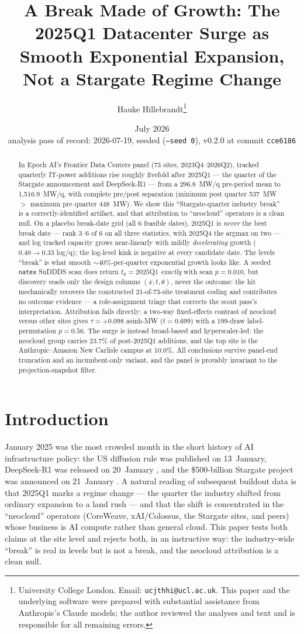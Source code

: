 \documentclass[11pt]{article}
\title{A Break Made of Growth: The 2025Q1 Datacenter Surge as Smooth
Exponential Expansion, Not a Stargate Regime Change}
\author{Hauke Hillebrandt\thanks{University College London. Email:
\texttt{ucjthhi@ucl.ac.uk}. This paper and the underlying \natex{} software were
prepared with substantial assistance from Anthropic's Claude models; the author
reviewed the analyses and text and is responsible for all remaining errors.}}
\date{July 2026 \\ \small analysis pass of record: 2026-07-19, seeded
(\texttt{--seed 0}), \natex{} v0.2.0 at commit \texttt{cce6186}}
\newcommand{\natex}{\texttt{natex}}
\begin{document}
\maketitle

\begin{abstract}
\noindent In Epoch AI's Frontier Data Centers panel (73 sites, 2023Q4--2026Q2),
tracked quarterly IT-power additions rise roughly fivefold after 2025Q1 --- the
quarter of the Stargate announcement and DeepSeek-R1 --- from a 296.8~MW/q
pre-period mean to 1{,}516.9~MW/q, with complete pre/post separation (minimum
post quarter 537~MW $>$ maximum pre quarter 448~MW). We show this
``Stargate-quarter industry break'' is a correctly-identified artifact, and
that attribution to ``neocloud'' operators is a clean null. On a placebo
break-date grid (all 6 feasible dates), 2025Q1 is \emph{never} the best break
date --- rank 3--6 of 6 on all three statistics, with 2025Q4 the argmax on two
--- and log tracked capacity grows near-linearly with mildly
\emph{decelerating} growth ($0.40 \to 0.33$ log/q); the log-level kink is
negative at every candidate date. The levels ``break'' is what smooth
$\sim$40\%-per-quarter exponential growth looks like. A seeded \natex{} SuDDDS
scan does return $t_0 = 2025$Q1 \emph{exactly} with scan $p=0.010$, but
discovery reads only the design columns $(x, t, \theta)$, never the outcome:
the hit mechanically recovers the constructed 21-of-73-site treatment coding
and contributes no outcome evidence --- a role-assignment triage that corrects
the scout pass's interpretation. Attribution fails directly: a two-way
fixed-effects contrast of neocloud versus other sites gives
$\tau = +0.098$ asinh-MW ($t=0.699$) with a 199-draw label-permutation
$p=0.56$. The surge is instead broad-based and hyperscaler-led: the neocloud
group carries 23.7\% of post-2025Q1 additions, and the top site is the
Anthropic--Amazon New Carlisle campus at 10.0\%. All conclusions survive
panel-end truncation and an incumbent-only variant, and the panel is provably
invariant to the projection-snapshot filter.
\end{abstract}

\section{Introduction}\label{sec:intro}

January 2025 was the most crowded month in the short history of AI
infrastructure policy: the US diffusion rule was published on 13~January,
DeepSeek-R1 was released on 20~January \cite{deepseekr1}, and the \$500-billion
Stargate project was announced on 21~January \cite{openai2025}. A natural
reading of subsequent buildout data is that 2025Q1 marks a regime change ---
the quarter the industry shifted from ordinary expansion to a land rush --- and
that the shift is concentrated in the ``neocloud'' operators (CoreWeave,
xAI/Colossus, the Stargate sites, and peers) whose business is AI compute
rather than general cloud. This paper tests both claims at the site level and
rejects both, in an instructive way: the industry-wide ``break'' is real in
levels but is not a break, and the neocloud attribution is a clean null.
\end{document}
